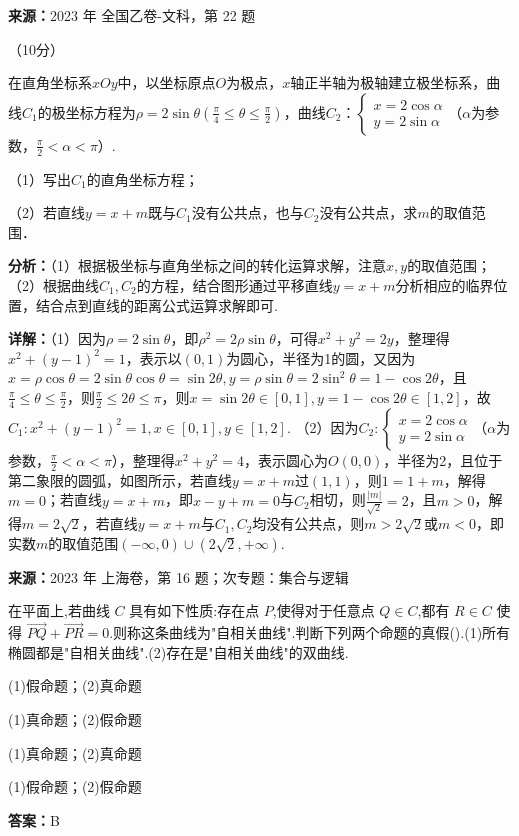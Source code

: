 \begin{question}[points=10]
\textbf{来源：}2023 年 全国乙卷-文科，第 22 题\par
[选修4-4]（10分）

在直角坐标系$xOy$中，以坐标原点$O$为极点，$x$轴正半轴为极轴建立极坐标系，曲线$C_1$的极坐标方程为$\rho=2\sin\theta \left(\frac{\pi}{4}\le\theta\le\frac{\pi}{2}\right)$，曲线$C_2$：$\begin{cases}x=2\cos\alpha\\y=2\sin\alpha\end{cases}$（$\alpha$为参数，$\frac{\pi}{2}<\alpha<\pi$）.

（1）写出$C_1$的直角坐标方程；

（2）若直线$y=x+m$既与$C_1$没有公共点，也与$C_2$没有公共点，求$m$的取值范围．
\begin{solution}

\textbf{分析：}（1）根据极坐标与直角坐标之间的转化运算求解，注意$x,y$的取值范围；
（2）根据曲线$C_1, C_2$的方程，结合图形通过平移直线$y=x+m$分析相应的临界位置，结合点到直线的距离公式运算求解即可.

\textbf{详解：}（1）因为$\rho=2\sin\theta$，即$\rho^2=2\rho\sin\theta$，可得$x^2+y^2=2y$，整理得$x^2+(y-1)^2=1$，表示以$(0,1)$为圆心，半径为1的圆，又因为$x=\rho\cos\theta=2\sin\theta\cos\theta=\sin2\theta, y=\rho\sin\theta=2\sin^2\theta=1-\cos2\theta$，且$\frac{\pi}{4}\le\theta\le\frac{\pi}{2}$，则$\frac{\pi}{2}\le2\theta\le\pi$，则$x=\sin2\theta\in[0,1], y=1-\cos2\theta\in[1,2]$，故$C_1: x^2+(y-1)^2=1, x\in[0,1], y\in[1,2]$.
（2）因为$C_2: \begin{cases}x=2\cos\alpha\\y=2\sin\alpha\end{cases}$（$\alpha$为参数，$\frac{\pi}{2}<\alpha<\pi$），整理得$x^2+y^2=4$，表示圆心为$O(0,0)$，半径为2，且位于第二象限的圆弧，如图所示，若直线$y=x+m$过$(1,1)$，则$1=1+m$，解得$m=0$；若直线$y=x+m$，即$x-y+m=0$与$C_2$相切，则$\frac{|m|}{\sqrt{2}}=2$，且$m>0$，解得$m=2\sqrt{2}$，若直线$y=x+m$与$C_1, C_2$均没有公共点，则$m>2\sqrt{2}$或$m<0$，即实数$m$的取值范围$(-\infty,0)\cup(2\sqrt{2},+\infty)$.
\end{solution}
\end{question}

\begin{question}[points=5]
\textbf{来源：}2023 年 上海卷，第 16 题；次专题：集合与逻辑\par
在平面上,若曲线 $C$ 具有如下性质:存在点 $P$,使得对于任意点 $Q\in C$,都有 $R\in C$ 使得 $\overrightarrow{PQ}+\overrightarrow{PR}=0$.则称这条曲线为"自相关曲线".判断下列两个命题的真假().(1)所有椭圆都是"自相关曲线".(2)存在是"自相关曲线"的双曲线.
\begin{choices}
  \item (1)假命题；(2)真命题
  \item (1)真命题；(2)假命题
  \item (1)真命题；(2)真命题
  \item (1)假命题；(2)假命题
\end{choices}
\begin{solution}
\textbf{答案：}B
\end{solution}
\end{question}

